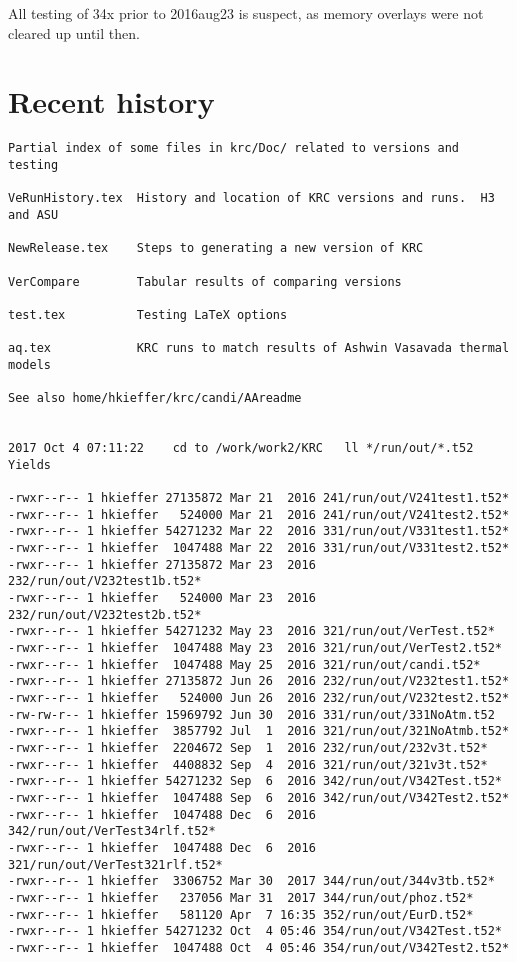\documentclass{article}
\begin{document}
All testing of 34x prior to 2016aug23 is suspect, as memory overlays were not cleared up until then.

\section{Recent history}
\vspace{-3.mm} 
\begin{verbatim}
Partial index of some files in krc/Doc/ related to versions and testing

VeRunHistory.tex  History and location of KRC versions and runs.  H3 and ASU 

NewRelease.tex    Steps to generating a new version of KRC

VerCompare        Tabular results of comparing versions

test.tex          Testing LaTeX options

aq.tex            KRC runs to match results of Ashwin Vasavada thermal models

See also home/hkieffer/krc/candi/AAreadme


2017 Oct 4 07:11:22    cd to /work/work2/KRC   ll */run/out/*.t52  Yields

-rwxr--r-- 1 hkieffer 27135872 Mar 21  2016 241/run/out/V241test1.t52*
-rwxr--r-- 1 hkieffer   524000 Mar 21  2016 241/run/out/V241test2.t52*
-rwxr--r-- 1 hkieffer 54271232 Mar 22  2016 331/run/out/V331test1.t52*
-rwxr--r-- 1 hkieffer  1047488 Mar 22  2016 331/run/out/V331test2.t52*
-rwxr--r-- 1 hkieffer 27135872 Mar 23  2016 232/run/out/V232test1b.t52*
-rwxr--r-- 1 hkieffer   524000 Mar 23  2016 232/run/out/V232test2b.t52*
-rwxr--r-- 1 hkieffer 54271232 May 23  2016 321/run/out/VerTest.t52*
-rwxr--r-- 1 hkieffer  1047488 May 23  2016 321/run/out/VerTest2.t52*
-rwxr--r-- 1 hkieffer  1047488 May 25  2016 321/run/out/candi.t52*
-rwxr--r-- 1 hkieffer 27135872 Jun 26  2016 232/run/out/V232test1.t52*
-rwxr--r-- 1 hkieffer   524000 Jun 26  2016 232/run/out/V232test2.t52*
-rw-rw-r-- 1 hkieffer 15969792 Jun 30  2016 331/run/out/331NoAtm.t52
-rwxr--r-- 1 hkieffer  3857792 Jul  1  2016 321/run/out/321NoAtmb.t52*
-rwxr--r-- 1 hkieffer  2204672 Sep  1  2016 232/run/out/232v3t.t52*
-rwxr--r-- 1 hkieffer  4408832 Sep  4  2016 321/run/out/321v3t.t52*
-rwxr--r-- 1 hkieffer 54271232 Sep  6  2016 342/run/out/V342Test.t52*
-rwxr--r-- 1 hkieffer  1047488 Sep  6  2016 342/run/out/V342Test2.t52*
-rwxr--r-- 1 hkieffer  1047488 Dec  6  2016 342/run/out/VerTest34rlf.t52*
-rwxr--r-- 1 hkieffer  1047488 Dec  6  2016 321/run/out/VerTest321rlf.t52*
-rwxr--r-- 1 hkieffer  3306752 Mar 30  2017 344/run/out/344v3tb.t52*
-rwxr--r-- 1 hkieffer   237056 Mar 31  2017 344/run/out/phoz.t52*
-rwxr--r-- 1 hkieffer   581120 Apr  7 16:35 352/run/out/EurD.t52*
-rwxr--r-- 1 hkieffer 54271232 Oct  4 05:46 354/run/out/V342Test.t52*
-rwxr--r-- 1 hkieffer  1047488 Oct  4 05:46 354/run/out/V342Test2.t52*


\end{verbatim}
\end{document}
